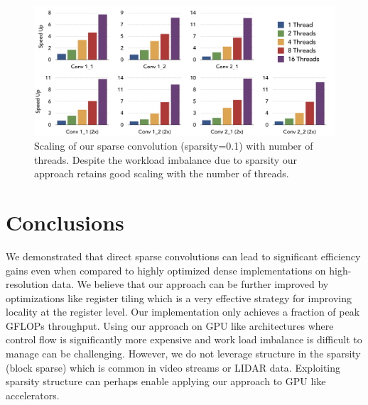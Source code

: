 \documentclass{article}
\begin{document}
\begin{figure}
	\centering
	\includegraphics[width=\textwidth]{scaling}
    \caption{Scaling of our sparse convolution (sparsity=0.1) with number of threads. Despite
    the workload imbalance due to sparsity our approach retains good scaling
    with the number of threads.}
\label{fig:scaling}
\end{figure}

\section{Conclusions}
\label{sec:conclusion}

We demonstrated that direct sparse convolutions can lead to significant
efficiency gains even when compared to highly optimized dense implementations on
high-resolution data. We believe that our approach can be further improved by
optimizations like register tiling which is a very effective strategy for
improving locality at the register level. Our implementation only achieves a
fraction of peak GFLOPs throughput. Using our approach on GPU like architectures
where control flow is significantly more expensive and work load imbalance is
difficult to manage can be challenging.  However, we do not leverage structure
in the sparsity (block sparse) which is common in video streams or LIDAR data.
Exploiting sparsity structure can perhaps enable applying our approach to GPU
like accelerators. 


\nocite{*}
{}
\end{document}
